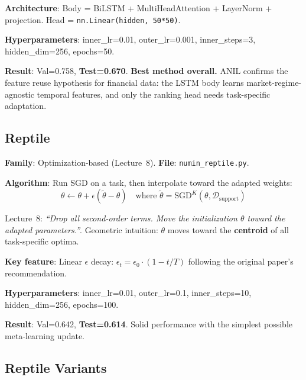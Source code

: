\documentclass[11pt,a4paper]{article}
\begin{document}
\textbf{Architecture}: Body = BiLSTM + MultiHeadAttention + LayerNorm + projection. Head = \texttt{nn.Linear(hidden, 50*50)}.

\textbf{Hyperparameters}: inner\_lr=0.01, outer\_lr=0.001, inner\_steps=3, hidden\_dim=256, epochs=50.

\textbf{Result}: Val=0.758, \textcolor{bestgreen}{\textbf{Test=0.670}}. \textbf{Best method overall.} ANIL confirms the feature reuse hypothesis for financial data: the LSTM body learns market-regime-agnostic temporal features, and only the ranking head needs task-specific adaptation.

\subsection{Reptile~\cite{nichol2018}}

\textbf{Family}: Optimization-based (Lecture~8). \textbf{File}: \texttt{numin\_reptile.py}.

\textbf{Algorithm}: Run SGD on a task, then interpolate toward the adapted weights:
\begin{equation}
  \boxed{\theta \leftarrow \theta + \epsilon(\tilde{\theta} - \theta)} \quad \text{where } \tilde{\theta} = \text{SGD}^K(\theta, \mathcal{D}_{\text{support}})
\end{equation}

Lecture~8: \emph{``Drop all second-order terms. Move the initialization $\theta$ toward the adapted parameters.''}. Geometric intuition: $\theta$ moves toward the \textbf{centroid} of all task-specific optima.

\textbf{Key feature}: Linear $\epsilon$ decay: $\epsilon_t = \epsilon_0 \cdot (1 - t/T)$ following the original paper's recommendation.

\textbf{Hyperparameters}: inner\_lr=0.01, outer\_lr=0.1, inner\_steps=10, hidden\_dim=256, epochs=100.

\textbf{Result}: Val=0.642, \textbf{Test=0.614}. Solid performance with the simplest possible meta-learning update.

\subsection{Reptile Variants}
\end{document}
